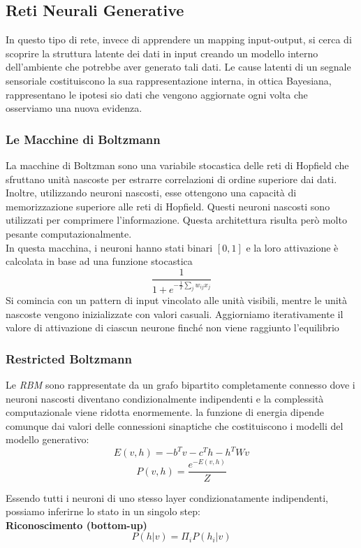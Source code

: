 \documentclass[12pt, a4paper]{article}
\begin{document}
\subsection{Reti Neurali Generative}
In questo tipo di rete, invece di apprendere un mapping input-output, si cerca di scoprire la struttura latente dei dati in input creando un modello interno dell'ambiente che potrebbe aver generato tali dati. Le cause latenti di un segnale sensoriale costituiscono la sua rappresentazione interna, in ottica Bayesiana, rappresentano le ipotesi sio dati che vengono aggiornate ogni volta che osserviamo una nuova evidenza.\\

\subsubsection{Le Macchine di Boltzmann}
La macchine di Boltzman sono una variabile stocastica delle reti di Hopfield che sfruttano unità nascoste per estrarre correlazioni di ordine superiore dai dati. Inoltre, utilizzando neuroni nascosti, esse ottengono una capacità di memorizzazione superiore alle reti di Hopfield. Questi neuroni nascosti sono utilizzati per comprimere l'informazione. Questa architettura risulta però molto pesante computazionalmente.
\\
In questa macchina, i neuroni hanno stati binari \([0, 1]\) e la loro attivazione è calcolata in base ad una funzione stocastica
\[\frac{1}{1+e^{-\frac{1}{T} \sum_j w_{ij}x_j}}\]
Si comincia con un pattern di input vincolato alle unità visibili, mentre le unità nascoste vengono inizializzate con valori casuali. Aggiorniamo iterativamente il valore di attivazione di ciascun neurone finché non viene raggiunto l'equilibrio

\subsubsection{Restricted Boltzmann}
Le \textit{RBM} sono rappresentate da un grafo bipartito completamente connesso dove i neuroni nascosti diventano condizionalmente indipendenti e la complessità computazionale viene ridotta enormemente. la funzione di energia dipende comunque dai valori delle connessioni sinaptiche che costituiscono i modelli del modello generativo:
\[E(v, h) = -b^Tv-c^Th-h^TWv\]
\[P(v, h) = \frac{e^{-E(v,h)}}{Z}\]

Essendo tutti i neuroni di uno stesso layer condizionatamente indipendenti, possiamo inferirne lo stato in un singolo step:\\
\textbf{Riconoscimento (bottom-up)}
\[P(h|v) = \Pi_i P(h_i|v)\]
\end{document}
